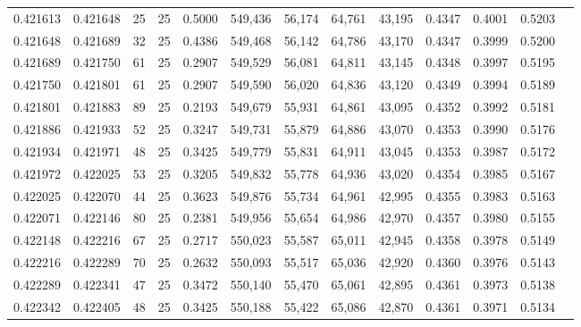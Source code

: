 \begin{tabular}{rrrrrrrrrrrrr}
0.421613 & 0.421648 &    25 &  25 &                                     0.5000 & 549,436 &  56,174 &  64,761 &  43,195 & 0.4347 & 0.4001 & 0.5203 \\
0.421648 & 0.421689 &    32 &  25 &                                     0.4386 & 549,468 &  56,142 &  64,786 &  43,170 & 0.4347 & 0.3999 & 0.5200 \\
0.421689 & 0.421750 &    61 &  25 &                                     0.2907 & 549,529 &  56,081 &  64,811 &  43,145 & 0.4348 & 0.3997 & 0.5195 \\
0.421750 & 0.421801 &    61 &  25 &                                     0.2907 & 549,590 &  56,020 &  64,836 &  43,120 & 0.4349 & 0.3994 & 0.5189 \\
0.421801 & 0.421883 &    89 &  25 &                                     0.2193 & 549,679 &  55,931 &  64,861 &  43,095 & 0.4352 & 0.3992 & 0.5181 \\
0.421886 & 0.421933 &    52 &  25 &                                     0.3247 & 549,731 &  55,879 &  64,886 &  43,070 & 0.4353 & 0.3990 & 0.5176 \\
0.421934 & 0.421971 &    48 &  25 &                                     0.3425 & 549,779 &  55,831 &  64,911 &  43,045 & 0.4353 & 0.3987 & 0.5172 \\
0.421972 & 0.422025 &    53 &  25 &                                     0.3205 & 549,832 &  55,778 &  64,936 &  43,020 & 0.4354 & 0.3985 & 0.5167 \\
0.422025 & 0.422070 &    44 &  25 &                                     0.3623 & 549,876 &  55,734 &  64,961 &  42,995 & 0.4355 & 0.3983 & 0.5163 \\
0.422071 & 0.422146 &    80 &  25 &                                     0.2381 & 549,956 &  55,654 &  64,986 &  42,970 & 0.4357 & 0.3980 & 0.5155 \\
0.422148 & 0.422216 &    67 &  25 &                                     0.2717 & 550,023 &  55,587 &  65,011 &  42,945 & 0.4358 & 0.3978 & 0.5149 \\
0.422216 & 0.422289 &    70 &  25 &                                     0.2632 & 550,093 &  55,517 &  65,036 &  42,920 & 0.4360 & 0.3976 & 0.5143 \\
0.422289 & 0.422341 &    47 &  25 &                                     0.3472 & 550,140 &  55,470 &  65,061 &  42,895 & 0.4361 & 0.3973 & 0.5138 \\
0.422342 & 0.422405 &    48 &  25 &                                     0.3425 & 550,188 &  55,422 &  65,086 &  42,870 & 0.4361 & 0.3971 & 0.5134 \\

\end{tabular}
